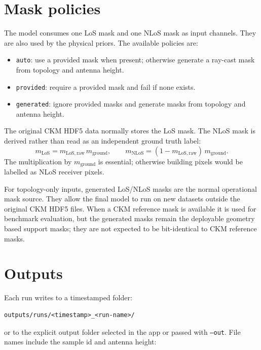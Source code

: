 \section{Mask policies}

The model consumes one LoS mask and one NLoS mask as input channels. They are
also used by the physical priors. The available policies are:

\begin{itemize}
\setlength\itemsep{0.15em}
  \item \texttt{auto}: use a provided mask when present; otherwise generate a
        ray-cast mask from topology and antenna height.
  \item \texttt{provided}: require a provided mask and fail if none exists.
  \item \texttt{generated}: ignore provided masks and generate masks from
        topology and antenna height.
\end{itemize}

The original CKM HDF5 data normally stores the LoS mask. The NLoS mask is
derived rather than read as an independent ground truth label:
\begin{equation}
  m_{\mathrm{LoS}} = m_{\mathrm{LoS,raw}}\,m_{\mathrm{ground}},
  \qquad
  m_{\mathrm{NLoS}} = (1-m_{\mathrm{LoS,raw}})\,m_{\mathrm{ground}}.
\label{eq:generator_support_masks}
\end{equation}
The multiplication by \(m_{\mathrm{ground}}\) is essential; otherwise building
pixels would be labelled as NLoS receiver pixels.

For topology-only inputs, generated LoS/NLoS masks are the normal operational
mask source. They allow the final model to run on new datasets outside the
original CKM HDF5 files. When a CKM reference mask is available it is used for
benchmark evaluation, but the generated masks remain the deployable geometry
based support masks; they are not expected to be bit-identical to CKM reference
masks.

\section{Outputs}

Each run writes to a timestamped folder:

{\scriptsize
\begin{verbatim}
outputs/runs/<timestamp>_<run-name>/
\end{verbatim}
}

or to the explicit output folder selected in the app or passed with
\texttt{--out}. File names include the sample id and antenna height:

